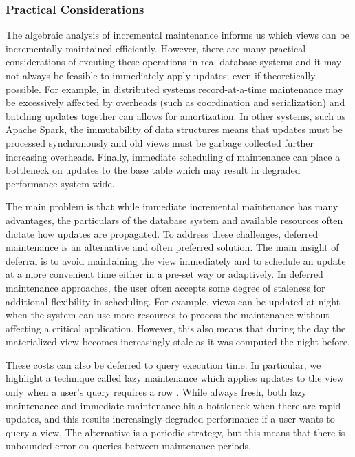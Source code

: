 \subsubsection{Practical Considerations}
The algebraic analysis of incremental maintenance \cite{DBLP:journals/vldb/KochAKNNLS14, DBLP:conf/pods/Koch10} informs us which views can be incrementally maintained efficiently.
However, there are many practical considerations of excuting these operations in real database systems and it may not always be feasible to immediately apply updates; even if theoretically possible.
For example, in distributed systems record-at-a-time maintenance may be excessively affected by overheads (such as coordination and serialization) and batching updates together can allows for amortization.
In other systems, such as Apache Spark, the immutability of data structures means that updates must be processed synchronously and old views must be garbage collected further increasing overheads.
Finally, immediate scheduling of maintenance can place a bottleneck on updates to the base table which may result in degraded performance system-wide.

The main problem is that while immediate incremental maintenance has many advantages, the particulars of the database system and available resources often dictate how updates are propagated.
To address these challenges, deferred maintenance is an alternative and often preferred solution.
The main insight of deferral is to avoid maintaining the view immediately and to schedule an update at a more convenient time either in a pre-set way or adaptively.
In deferred maintenance approaches, the user often accepts some degree of staleness for additional flexibility in scheduling.
For example, views can be updated at night when the system can use more resources to process the maintenance without affecting a critical application.
However, this also means that during the day the materialized view becomes increasingly stale as it was computed the night before.

These costs can also be deferred to query execution time.
In particular, we highlight a technique called lazy maintenance which applies updates to the view only when a user's query requires a row \cite{zhou2007lazy}.
While always fresh, both lazy maintenance and immediate maintenance hit a bottleneck when there are rapid updates, and this results increasingly degraded performance if a user wants to query a view.
The alternative is a periodic strategy, but this means that there is unbounded error on queries between maintenance periods.

